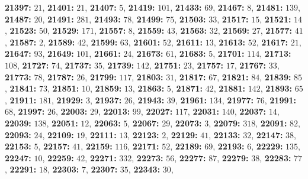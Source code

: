 \textsf{\bfseries 21397:} $21$, \textsf{\bfseries 21401:} $21$, \textsf{\bfseries 21407:} $5$, \textsf{\bfseries 21419:} $101$, \textsf{\bfseries 21433:} $69$, \textsf{\bfseries 21467:} $8$, \textsf{\bfseries 21481:} $139$, \textsf{\bfseries 21487:} $20$, \textsf{\bfseries 21491:} $281$, \textsf{\bfseries 21493:} $78$, \textsf{\bfseries 21499:} $75$, \textsf{\bfseries 21503:} $33$, \textsf{\bfseries 21517:} $15$, \textsf{\bfseries 21521:} $14$, \textsf{\bfseries 21523:} $50$, \textsf{\bfseries 21529:} $171$, \textsf{\bfseries 21557:} $8$, \textsf{\bfseries 21559:} $43$, \textsf{\bfseries 21563:} $32$, \textsf{\bfseries 21569:} $27$, \textsf{\bfseries 21577:} $41$, \textsf{\bfseries 21587:} $2$, \textsf{\bfseries 21589:} $42$, \textsf{\bfseries 21599:} $63$, \textsf{\bfseries 21601:} $52$, \textsf{\bfseries 21611:} $13$, \textsf{\bfseries 21613:} $52$, \textsf{\bfseries 21617:} $21$, \textsf{\bfseries 21647:} $93$, \textsf{\bfseries 21649:} $101$, \textsf{\bfseries 21661:} $24$, \textsf{\bfseries 21673:} $61$, \textsf{\bfseries 21683:} $5$, \textsf{\bfseries 21701:} $114$, \textsf{\bfseries 21713:} $108$, \textsf{\bfseries 21727:} $74$, \textsf{\bfseries 21737:} $35$, \textsf{\bfseries 21739:} $142$, \textsf{\bfseries 21751:} $23$, \textsf{\bfseries 21757:} $17$, \textsf{\bfseries 21767:} $33$, \textsf{\bfseries 21773:} $78$, \textsf{\bfseries 21787:} $26$, \textsf{\bfseries 21799:} $117$, \textsf{\bfseries 21803:} $31$, \textsf{\bfseries 21817:} $67$, \textsf{\bfseries 21821:} $84$, \textsf{\bfseries 21839:} $85$, \textsf{\bfseries 21841:} $73$, \textsf{\bfseries 21851:} $10$, \textsf{\bfseries 21859:} $13$, \textsf{\bfseries 21863:} $5$, \textsf{\bfseries 21871:} $42$, \textsf{\bfseries 21881:} $142$, \textsf{\bfseries 21893:} $65$, \textsf{\bfseries 21911:} $181$, \textsf{\bfseries 21929:} $3$, \textsf{\bfseries 21937:} $26$, \textsf{\bfseries 21943:} $39$, \textsf{\bfseries 21961:} $134$, \textsf{\bfseries 21977:} $76$, \textsf{\bfseries 21991:} $68$, \textsf{\bfseries 21997:} $26$, \textsf{\bfseries 22003:} $29$, \textsf{\bfseries 22013:} $99$, \textsf{\bfseries 22027:} $117$, \textsf{\bfseries 22031:} $140$, \textsf{\bfseries 22037:} $14$, \textsf{\bfseries 22039:} $138$, \textsf{\bfseries 22051:} $12$, \textsf{\bfseries 22063:} $5$, \textsf{\bfseries 22067:} $29$, \textsf{\bfseries 22073:} $3$, \textsf{\bfseries 22079:} $318$, \textsf{\bfseries 22091:} $82$, \textsf{\bfseries 22093:} $24$, \textsf{\bfseries 22109:} $19$, \textsf{\bfseries 22111:} $13$, \textsf{\bfseries 22123:} $2$, \textsf{\bfseries 22129:} $41$, \textsf{\bfseries 22133:} $32$, \textsf{\bfseries 22147:} $38$, \textsf{\bfseries 22153:} $5$, \textsf{\bfseries 22157:} $41$, \textsf{\bfseries 22159:} $116$, \textsf{\bfseries 22171:} $52$, \textsf{\bfseries 22189:} $69$, \textsf{\bfseries 22193:} $6$, \textsf{\bfseries 22229:} $135$, \textsf{\bfseries 22247:} $10$, \textsf{\bfseries 22259:} $42$, \textsf{\bfseries 22271:} $332$, \textsf{\bfseries 22273:} $56$, \textsf{\bfseries 22277:} $87$, \textsf{\bfseries 22279:} $38$, \textsf{\bfseries 22283:} $77$, \textsf{\bfseries 22291:} $18$, \textsf{\bfseries 22303:} $7$, \textsf{\bfseries 22307:} $35$, \textsf{\bfseries 22343:} $30$, 
